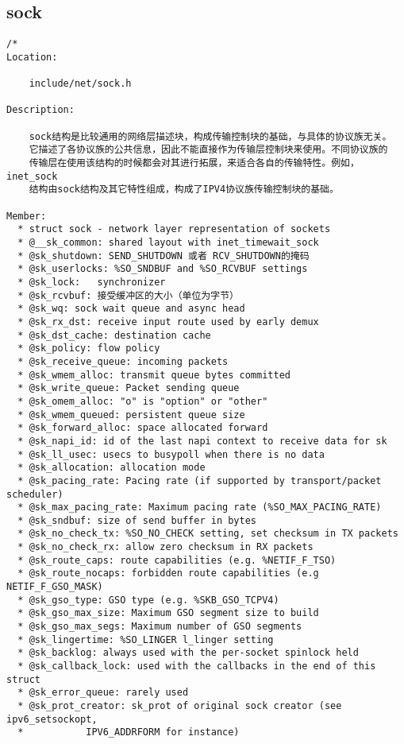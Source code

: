         \subsection{sock}
\begin{verbatim}
/*
Location:

    include/net/sock.h

Description:

    sock结构是比较通用的网络层描述块，构成传输控制块的基础，与具体的协议族无关。
    它描述了各协议族的公共信息，因此不能直接作为传输层控制块来使用。不同协议族的
    传输层在使用该结构的时候都会对其进行拓展，来适合各自的传输特性。例如，inet_sock
    结构由sock结构及其它特性组成，构成了IPV4协议族传输控制块的基础。

Member:
  * struct sock - network layer representation of sockets
  * @__sk_common: shared layout with inet_timewait_sock
  * @sk_shutdown: SEND_SHUTDOWN 或者 RCV_SHUTDOWN的掩码
  * @sk_userlocks: %SO_SNDBUF and %SO_RCVBUF settings
  * @sk_lock:   synchronizer
  * @sk_rcvbuf: 接受缓冲区的大小（单位为字节）
  * @sk_wq: sock wait queue and async head
  * @sk_rx_dst: receive input route used by early demux
  * @sk_dst_cache: destination cache
  * @sk_policy: flow policy
  * @sk_receive_queue: incoming packets
  * @sk_wmem_alloc: transmit queue bytes committed
  * @sk_write_queue: Packet sending queue
  * @sk_omem_alloc: "o" is "option" or "other"
  * @sk_wmem_queued: persistent queue size
  * @sk_forward_alloc: space allocated forward
  * @sk_napi_id: id of the last napi context to receive data for sk
  * @sk_ll_usec: usecs to busypoll when there is no data
  * @sk_allocation: allocation mode
  * @sk_pacing_rate: Pacing rate (if supported by transport/packet scheduler)
  * @sk_max_pacing_rate: Maximum pacing rate (%SO_MAX_PACING_RATE)
  * @sk_sndbuf: size of send buffer in bytes
  * @sk_no_check_tx: %SO_NO_CHECK setting, set checksum in TX packets
  * @sk_no_check_rx: allow zero checksum in RX packets
  * @sk_route_caps: route capabilities (e.g. %NETIF_F_TSO)
  * @sk_route_nocaps: forbidden route capabilities (e.g NETIF_F_GSO_MASK)
  * @sk_gso_type: GSO type (e.g. %SKB_GSO_TCPV4)
  * @sk_gso_max_size: Maximum GSO segment size to build
  * @sk_gso_max_segs: Maximum number of GSO segments
  * @sk_lingertime: %SO_LINGER l_linger setting
  * @sk_backlog: always used with the per-socket spinlock held
  * @sk_callback_lock: used with the callbacks in the end of this struct
  * @sk_error_queue: rarely used
  * @sk_prot_creator: sk_prot of original sock creator (see ipv6_setsockopt,
  *           IPV6_ADDRFORM for instance)

\end{verbatim}
